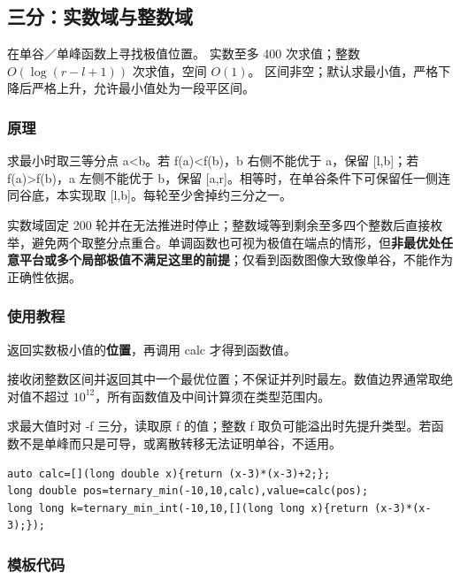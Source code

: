 \subsection{三分：实数域与整数域}
\label{other:ternary}
\AlgorithmInfo
    {在单谷／单峰函数上寻找极值位置。}
    {实数至多 400 次求值；整数 $O(\log(r-l+1))$ 次求值，空间 $O(1)$。}
    {区间非空；默认求最小值，严格下降后严格上升，允许最小值处为一段平区间。}
\subsubsection*{原理}
求最小时取三等分点 a<b。若 f(a)<f(b)，b 右侧不能优于 a，保留 [l,b]；若 f(a)>f(b)，a 左侧不能优于 b，保留 [a,r]。相等时，在单谷条件下可保留任一侧连同谷底，本实现取 [l,b]。每轮至少舍掉约三分之一。

实数域固定 200 轮并在无法推进时停止；整数域等到剩余至多四个整数后直接枚举，避免两个取整分点重合。单调函数也可视为极值在端点的情形，但\textbf{非最优处任意平台或多个局部极值不满足这里的前提}；仅看到函数图像大致像单谷，不能作为正确性依据。
\subsubsection*{使用教程}
 返回实数极小值的\textbf{位置}，再调用 calc 才得到函数值。

 接收闭整数区间并返回其中一个最优位置；不保证并列时最左。数值边界通常取绝对值不超过 $10^{12}$，所有函数值及中间计算须在类型范围内。

求最大值时对 -f 三分，读取原 f 的值；整数 f 取负可能溢出时先提升类型。若函数不是单峰而只是可导，或离散转移无法证明单谷，不适用。
\begin{lstlisting}[style=mtycpp,numbers=none]
auto calc=[](long double x){return (x-3)*(x-3)+2;};
long double pos=ternary_min(-10,10,calc),value=calc(pos);
long long k=ternary_min_int(-10,10,[](long long x){return (x-3)*(x-3);});
\end{lstlisting}
\subsubsection*{模板代码}

